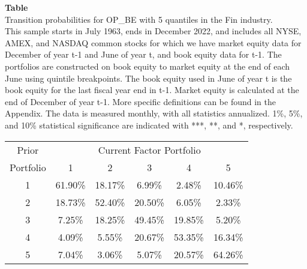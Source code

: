 \begin{table*}[ht!]
\raggedright
{}
\label{tab: transition_probs_OP_BE_Fin_with_5_quantiles}
\textbf{Table \thetable} \\
Transition probabilities for OP_BE with 5 quantiles in the Fin industry. \\
\hspace*{1em}This sample starts in July 1963, ends in December 2022, and includes all NYSE, AMEX, and NASDAQ common stocks for which we have market equity data for December of year t-1 and June of year t, and book equity data for t-1. The portfolios are constructed on book equity to market equity at the end of each June using quintile breakpoints.  The book equity used in June of year t is the book equity for the last fiscal year end in t-1.  Market equity is calculated at the end of December of year t-1.  More specific definitions can be found in the Appendix.  The data is measured monthly, with all statistics annualized.  1\%, 5\%, and 10\% statistical significance are indicated with ***, **, and *, respectively. \\
\vspace{0.5em}
\centering
\begin{adjustbox}{max width=\textwidth}
\begin{tabular}{@{}cccccc@{}}
\toprule
Prior & \multicolumn{5}{c}{Current Factor Portfolio} \\
Portfolio & 1 & 2 & 3 & 4 & 5 \\
\midrule
1 & 61.90\% & 18.17\% & 6.99\% & 2.48\% & 10.46\% \\
2 & 18.73\% & 52.40\% & 20.50\% & 6.05\% & 2.33\% \\
3 & 7.25\% & 18.25\% & 49.45\% & 19.85\% & 5.20\% \\
4 & 4.09\% & 5.55\% & 20.67\% & 53.35\% & 16.34\% \\
5 & 7.04\% & 3.06\% & 5.07\% & 20.57\% & 64.26\% \\
\bottomrule
\end{tabular}
\end{adjustbox}
\end{table*}